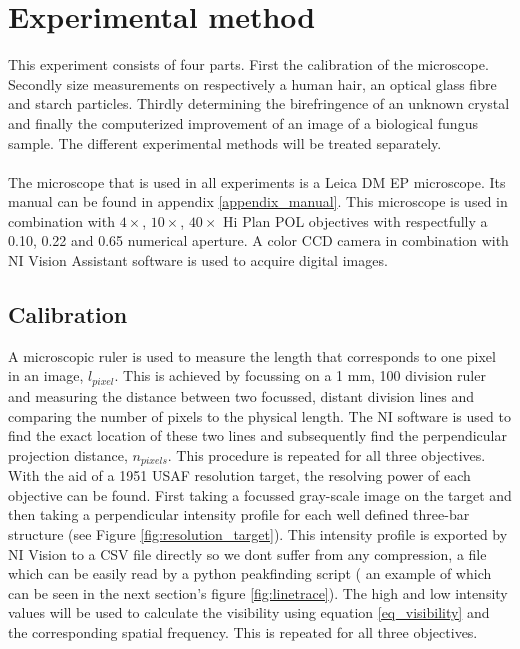 \section{Experimental method}

This experiment consists of four parts. First the calibration of the microscope. Secondly size measurements on respectively a human hair, an optical glass fibre and starch particles. Thirdly determining the birefringence of an unknown crystal and finally the computerized improvement of an image of a biological fungus sample. The different experimental methods will be treated separately.\\
\\
The microscope that is used in all experiments is a Leica DM EP microscope. Its manual can be found in appendix \ref{appendix_manual}. This microscope is used in combination with $4\times$, $10\times$, $40\times$ Hi Plan POL objectives with respectfully a 0.10, 0.22 and 0.65 numerical aperture. A color CCD camera in combination with NI Vision Assistant software is used to acquire digital images.

\subsection{Calibration}
\label{expmeth_calibration}
A microscopic ruler is used to measure the length that corresponds to one pixel in an image, $l_{pixel}$. This is achieved by focussing on a 1 mm, 100 division ruler and measuring the distance between two focussed, distant division lines and comparing the number of pixels to the physical length. The NI software is used to find the exact location of these two lines and subsequently find the perpendicular projection distance, $n_{pixels}$. This procedure is repeated for all three objectives. \\
\bigskip 
With the aid of a 1951 USAF resolution target, the resolving power of each objective can be found. First taking a focussed gray-scale image  on the target and then taking a perpendicular intensity profile for each well defined three-bar structure (see Figure \ref{fig:resolution_target}). This intensity profile is exported by NI Vision to a CSV file directly so we dont suffer from any compression, a file which can be easily read by a python peakfinding script ( an example of which can be seen in the next section's figure \ref{fig:linetrace}). The high and low intensity values will be used to calculate the visibility using equation \ref{eq_visibility} and the corresponding spatial frequency. This is repeated for all three objectives.\\

